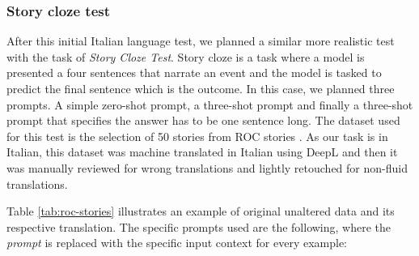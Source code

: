 \subsubsection{Story cloze test}
After this initial Italian language test, we planned a similar more realistic test with the task of \emph{Story Cloze Test}. Story cloze is a task where a model is presented a four sentences that narrate an event and the model is tasked to predict the final sentence which is the outcome. In this case, we planned three prompts. A simple zero-shot prompt, a three-shot prompt and finally a three-shot prompt that specifies the answer has to be one sentence long. The dataset used for this test is the selection of 50 stories from ROC stories \cite{roc}. As our task is in Italian, this dataset was machine translated in Italian using DeepL \cite{} and then it was manually reviewed for wrong translations and lightly retouched for non-fluid translations. 

Table \ref{tab:roc-stories} illustrates an example of original unaltered data and its respective translation.
The specific prompts used are the following, where the \emph{prompt} is replaced with the specific input context for every example:
